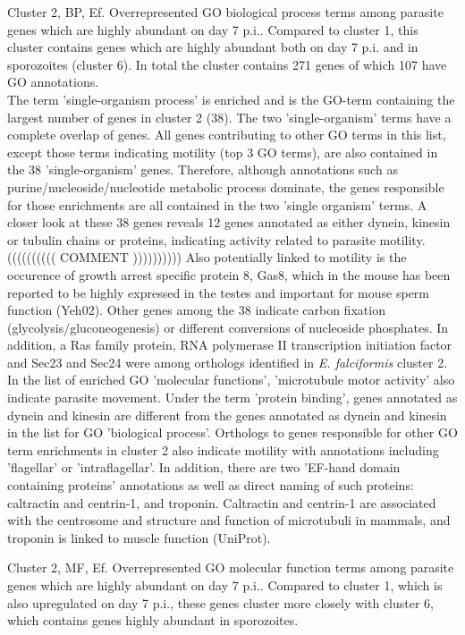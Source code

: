 \documentclass{article}
\begin{document}
Cluster 2, BP, Ef.
Overrepresented GO biological process terms among parasite genes which are 
highly abundant on day 7 p.i.. Compared to cluster 1, this cluster contains genes 
which are highly abundant both on day 7 p.i. and in sporozoites (cluster 6).
In total the cluster contains 271 genes of which 107 have GO annotations.\\
\newline
The term 'single-organism process' is enriched and is the GO-term containing the largest
number of genes in cluster 2 (38). The two 'single-organism' terms have a complete overlap of genes.
All genes contributing to other GO terms in this list, except those terms indicating motility 
(top 3 GO terms), are also contained in the 38 'single-organism' genes.
Therefore, although annotations such as purine/nucleoside/nucleotide metabolic process 
dominate, the genes responsible for those enrichments are all contained in the two 'single organism'
terms.
A closer look at these 38 genes reveals 12 genes annotated as either dynein, kinesin or tubulin chains or 
proteins, indicating activity related to parasite motility. (((((((((( COMMENT ))))))))))
Also potentially linked to motility is the 
occurence of growth arrest specific protein 8, Gas8, which in the mouse has been reported to be highly 
expressed in the testes and important for mouse sperm function (Yeh02). Other genes among the 38 indicate
carbon fixation (glycolysis/gluconeogenesis) or different conversions of nucleoside phosphates. 
In addition, a Ras family protein, RNA polymerase II transcription initiation factor and 
Sec23 and Sec24 were among orthologs identified in \textit{E. falciformis} cluster 2.
In the list of enriched GO 'molecular functions', 'microtubule motor activity' also indicate 
parasite movement. Under the term 'protein binding', genes annotated as dynein and kinesin 
are different from the genes annotated as dynein and kinesin in the list for 
GO 'biological process'. 
Orthologs to genes responsible for other GO term enrichments in cluster 2 also indicate motility
with annotations including 'flagellar' or 'intraflagellar'.
In addition, there are two 'EF-hand 
domain containing proteins' annotations as well as direct naming of such proteins: caltractin and 
centrin-1, and troponin. Caltractin and centrin-1 are associated with the centrosome 
and structure and function of microtubuli in mammals, and troponin is linked to muscle function 
(UniProt). 


Cluster 2, MF, Ef.
Overrepresented GO molecular function terms among parasite genes which are 
highly abundant on day 7 p.i.. Compared to cluster 1, which is also upregulated 
on day 7 p.i., these genes cluster more closely with cluster 6, which contains
genes highly abundant in sporozoites.\\
\end{document}
